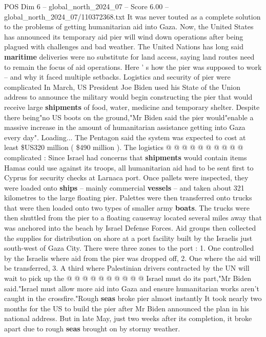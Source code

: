 \begin{textsample}{POS Dim 6 – global\_north\_2024\_07 – Score 6.00 – global\_north\_2024\_07/110372368.txt}  \label{ex:f6_pos_235}
It was never touted as a complete solution to the problems of getting humanitarian aid into Gaza.
Now, the United States has announced its temporary aid pier will wind down operations after being plagued with challenges and bad weather.
The United Nations has long said \textbf{maritime} deliveries were no substitute for land access, saying land routes need to remain the focus of aid operations.
Here ' s how the pier was supposed to work -- and why it faced multiple setbacks.
Logistics and security of pier were complicated In March, US President Joe Biden used his State of the Union address to announce the military would begin constructing the pier that would receive large \textbf{shipments} of food, water, medicine and temporary shelter.
Despite there being"no US boots on the ground,"Mr Biden said the pier would"enable a massive increase in the amount of humanitarian assistance getting into Gaza every day".
Loading...
The Pentagon said the system was expected to cost at least \$US320 million ( \$490 million ).
The logistics @ @ @ @ @ @ @ @ @ @ complicated : Since Israel had concerns that \textbf{shipments} would contain items Hamas could use against its troops, all humanitarian aid had to be sent first to Cyprus for security checks at Larnaca port.
Once pallets were inspected, they were loaded onto \textbf{ships} -- mainly commercial \textbf{vessels} -- and taken about 321 kilometres to the large floating pier.
Palettes were then transferred onto trucks that were then loaded onto two types of smaller army \textbf{boats}.
The trucks were then shuttled from the pier to a floating causeway located several miles away that was anchored into the beach by Israel Defense Forces.
Aid groups then collected the supplies for distribution on shore at a port facility built by the Israelis just south-west of Gaza City.
There were three zones to the port : 1.
One controlled by the Israelis where aid from the pier was dropped off, 2.
One where the aid will be transferred, 3.
A third where Palestinian drivers contracted by the UN will wait to pick up the @ @ @ @ @ @ @ @ @ @ Israel must do its part,"Mr Biden said."Israel must allow more aid into Gaza and ensure humanitarian works aren't caught in the crossfire."Rough \textbf{seas} broke pier almost instantly It took nearly two months for the US to build the pier after Mr Biden announced the plan in his national address.
But in late May, just two weeks after its completion, it broke apart due to rough \textbf{seas} brought on by stormy weather.

\end{textsample}
